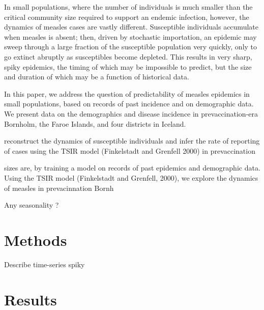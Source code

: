 \documentclass[10pt]{article}
\begin{document}
In small populations, where the number of individuals is much smaller than the critical community size required to support an endemic infection, however, the dynamics of measles cases are vastly different. Susceptible individuals accumulate when measles is absent; then, driven by stochastic importation, an epidemic may sweep through a large fraction of the susceptible population very quickly, only to go extinct abruptly as susceptibles become depleted. This results in very sharp, spiky epidemics, the timing of which may be impossible to predict, but the size and duration of which may be a function of historical data. 

In this paper, we address the question of predictability of measles epidemics in small populations, based on records of past incidence and on demographic data. We present data on the demographics and disease incidence in prevaccination-era Bornholm, the Faroe Islands, and four districts in Iceland. 

reconstruct the dynamics of susceptible individuals and infer the rate of reporting of cases using the TSIR model (Finkelstadt and Grenfell 2000) in prevaccination 
 
	

sizes are, by training a model on records of past epidemics and demographic data. Using the TSIR model (Finkelstadt and Grenfell, 2000), we explore the dynamics of measles in prevacinnation Bornh


Any seasonality ? 






\section*{Methods}

Describe time-series spiky



\section*{Results}
\end{document}
